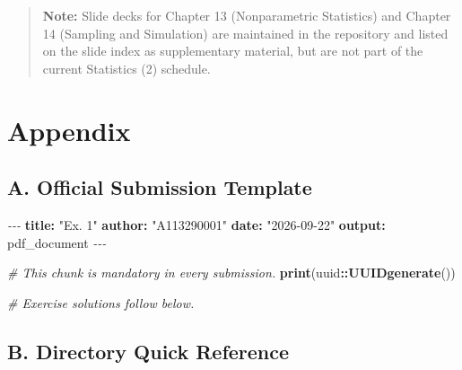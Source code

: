 \documentclass[
]{article}
\newenvironment{Shaded}{\begin{snugshade}}{\end{snugshade}}
\newcommand{\AttributeTok}[1]{\textcolor[rgb]{0.13,0.29,0.53}{#1}}
\newcommand{\CommentTok}[1]{\textcolor[rgb]{0.56,0.35,0.01}{\textit{#1}}}
\newcommand{\FunctionTok}[1]{\textcolor[rgb]{0.13,0.29,0.53}{\textbf{#1}}}
\newcommand{\KeywordTok}[1]{\textcolor[rgb]{0.13,0.29,0.53}{\textbf{#1}}}
\newcommand{\NormalTok}[1]{#1}
\newcommand{\PreprocessorTok}[1]{\textcolor[rgb]{0.56,0.35,0.01}{\textit{#1}}}
\newcommand{\SpecialCharTok}[1]{\textcolor[rgb]{0.81,0.36,0.00}{\textbf{#1}}}
\newcommand{\StringTok}[1]{\textcolor[rgb]{0.31,0.60,0.02}{#1}}
\begin{document}
\begin{quote}
\textbf{Note:} Slide decks for Chapter 13 (Nonparametric Statistics) and
Chapter 14 (Sampling and Simulation) are maintained in the repository
and listed on the slide index as supplementary material, but are not
part of the current Statistics (2) schedule.
\end{quote}

\newpage

\section{Appendix}\label{appendix}

\subsection{A. Official Submission
Template}\label{a.-official-submission-template}

\begin{Shaded}
\begin{Highlighting}[]
\PreprocessorTok{{-}{-}{-}}
\FunctionTok{title}\KeywordTok{:}\AttributeTok{ }\StringTok{"Ex. 1"}
\FunctionTok{author}\KeywordTok{:}\AttributeTok{ }\StringTok{"A113290001"}
\FunctionTok{date}\KeywordTok{:}\AttributeTok{ }\StringTok{"2026{-}09{-}22"}
\FunctionTok{output}\KeywordTok{:}\AttributeTok{ pdf\_document}
\PreprocessorTok{{-}{-}{-}}
\end{Highlighting}
\end{Shaded}

\begin{Shaded}
\begin{Highlighting}[]
\CommentTok{\# This chunk is mandatory in every submission.}
\FunctionTok{print}\NormalTok{(uuid}\SpecialCharTok{::}\FunctionTok{UUIDgenerate}\NormalTok{())}

\CommentTok{\# Exercise solutions follow below.}
\end{Highlighting}
\end{Shaded}

\subsection{B. Directory Quick
Reference}\label{b.-directory-quick-reference}
\end{document}
